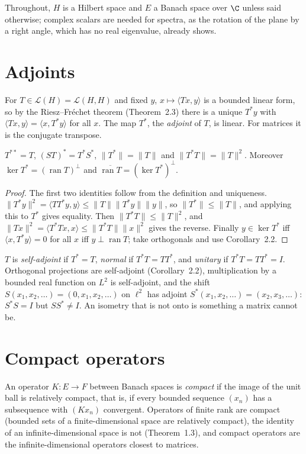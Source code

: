 Throughout, $H$ is a Hilbert space and $E$ a Banach space over $\C$ unless said otherwise; complex scalars are needed for spectra, as
the rotation of the plane by a right angle, which has no real eigenvalue, already shows.

\section{Adjoints}

For $T\in\mathcal L(H)=\mathcal L(H,H)$ and fixed $y$, $x\mapsto\langle Tx,y\rangle$ is a bounded linear form, so by the Riesz--Fr\'echet theorem (Theorem~2.3) there is a unique $T^*y$ with $\langle Tx,y\rangle=\langle x,T^*y\rangle$ for all
$x$. The map $T^*$, the \emph{adjoint} of $T$, is linear. For matrices it is the conjugate transpose.

\begin{proposition}\label{prop:adjoint}
$T^{**}=T$, $(ST)^*=T^*S^*$, $\|T^*\|=\|T\|$ and $\|T^*T\|=\|T\|^2$. Moreover $\ker T^*=(\operatorname{ran}T)^\perp$ and $\overline{\operatorname{ran}T}=(\ker T^*)^\perp$.
\end{proposition}
\begin{proof}
The first two identities follow from the definition and uniqueness. $\|T^*y\|^2=\langle TT^*y,y\rangle\le\|T\|\|T^*y\|\|y\|$, so $\|T^*\|\le\|T\|$, and applying this to $T^*$ gives equality. Then
$\|T^*T\|\le\|T\|^2$, and $\|Tx\|^2=\langle T^*Tx,x\rangle\le\|T^*T\|\|x\|^2$ gives the reverse. Finally $y\in\ker T^*$ iff $\langle x,T^*y\rangle=0$ for all $x$ iff $y\perp\operatorname{ran}T$; take orthogonals and use
Corollary~2.2.
\end{proof}

$T$ is \emph{self-adjoint} if $T^*=T$, \emph{normal} if $T^*T=TT^*$, and \emph{unitary} if $T^*T=TT^*=I$. Orthogonal projections are self-adjoint (Corollary~2.2), multiplication by a bounded real function on $L^2$ is self-adjoint, and
the shift $S(x_1,x_2,\dots)=(0,x_1,x_2,\dots)$ on $\ell^2$ has adjoint $S^*(x_1,x_2,\dots)=(x_2,x_3,\dots)$: $S^*S=I$ but $SS^*\ne I$. An isometry that is not onto is something a matrix cannot be.

\section{Compact operators}

An operator $K:E\to F$ between Banach spaces is \emph{compact} if the image of the unit ball is relatively compact, that is, if every bounded sequence $(x_n)$ has a subsequence with $(Kx_n)$ convergent. Operators of finite rank are compact
(bounded sets of a finite-dimensional space are relatively compact), the identity of an infinite-dimensional space is not (Theorem~1.3), and compact operators are the infinite-dimensional operators closest to matrices.

